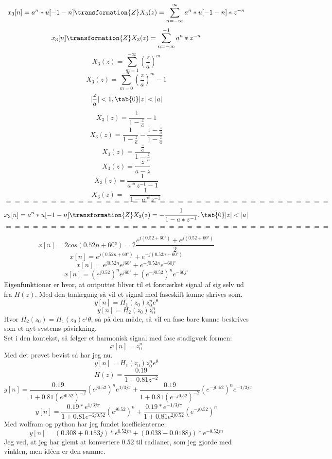 \begin{Udledninger}
\begin{underrubrik}
    \end{underrubrik}
    \begin{underrubrik}
        \[x_3[n] = a^n*u[-1-n] \transformation{Z} X_3(z) = \sum_{n=-\infty}^{\infty}     {a^n*u[-1-n]*z^{-n}}\]
        \[x_3[n] \transformation{Z} X_3(z) = \sum_{n=-\infty}^{-1}                               {a^n*z^{-n}}\]
        \[X_3(z) = \sum_{m = 1}^{-\infty}                                                   {(\frac{z}{a})^m}\]
        \[X_3(z) = \sum_{m = 0}^{-\infty}                                               {(\frac{z}{a})^m} - 1\]
        \[|\frac{z}{a}|<1, \tab{0} |z|<|a|\]
        \[X_3(z) = \frac{1}{1 - \frac{z}{a}} - 1\]
        \[X_3(z) = \frac{1}{1 - \frac{z}{a}} - \frac{1 - \frac{z}{a}}{1 - \frac{z}{a}}\]
        \[X_3(z) = \frac{\frac{z}{a}}{1 - \frac{z}{a}}\]
        \[X_3(z) = \frac{z}{a - z}\]
        \[X_3(z) = \frac{1}{a*z^{-1} - 1}\]
        \[X_3(z) = - \frac{1}{1 - a*z^{-1}}\]
        \[====================================\]
        \[x_3[n] = a^n*u[-1-n] \transformation{Z} X_3(z) = - \frac{1}{1 - a*z^{-1}}, \tab{0} |z|<|a|\]
        \[====================================\]
    \end{underrubrik}
    \begin{underrubrik} 
        \[x[n] = 2cos(0.52n + 60°) = 2 \frac{e^{j(0.52 + 60°)} + e^{j(0.52 + 60°)}}{2}\]
        \[x[n] = e^{j(0.52n + 60°)} + e^{-j(0.52n + 60°)}\]
        \[x[n] = e^{j0.52n}e^{j60°} + e^{-j0.52n}e^{-60j°}\]
        \[x[n] = (e^{j0.52})^ne^{j60°} + (e^{-j0.52})^ne^{-60j°}\]
        Eigenfunktioner er hvor, at outputtet bliver til et forstærket signal af sig selv ud fra $H(z)$. Med den tankegang så vil et signal med faseskift kunne skrives som. 
        \[y[n] = H_1(z_0)z_0^ne^\theta\] 
        \[y[n] = H_2(z_0)z_0^n\]
        Hvor $H_2(z_0) = H_1(z_0)e^j\theta$, så på den måde, så vil en fase bare kunne beskrives som et nyt systems påvirkning.\\
        Set i den kontekst, så følger et harmonisk signal med fase stadigvæk formen: 
        \[x[n] = z_0^n\]
        Med det prøvet bevist så har jeg nu. 
        \[y[n] = H_1(z_0)z_0^ne^\theta\] 
        \[H(z) = \frac{0.19}{1 + 0.81z^{-2}}\]
        \[y[n] = \frac{0.19}{1 + 0.81(e^{j0.52})^{-2}}(e^{j0.52})^ne^{1/3j\pi} + \frac{0.19}{1 + 0.81(e^{-j0.52})^{-2}}(e^{-j0.52})^ne^{-1/3j\pi}\] 
        \[y[n] = \frac{0.19*e^{1/3j\pi}}{1 + 0.81e^{-2j0.52}}(e^{j0.52})^n + \frac{0.19*e^{-1/3j\pi}}{1 + 0.81e^{2j0.52}}(e^{-j0.52})^n\] 
        Med wolfram og python har jeg fundet koefficienterne: 
        \[y[n] = (0.308 + 0.153j) * e^{0.52jn} + (0.038 - 0.0188j) * e^{-0.52jn}\]
        \color{red} Jeg ved, at jeg har glemt at konvertere 0.52 til radianer, som jeg gjorde med vinklen, men idéen er den samme.
        

\end{underrubrik}
\end{Udledninger}
